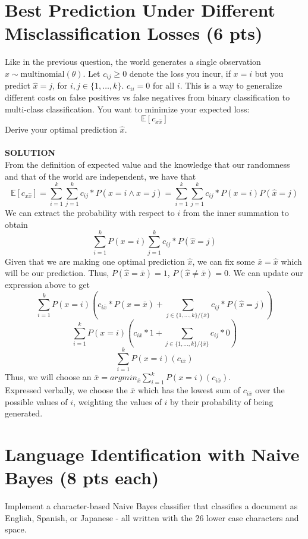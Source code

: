 \documentclass[a4paper]{article}
\theoremstyle{definition}
\def\E{\mathbb E}
\begin{document}
\section{Best Prediction Under Different Misclassification Losses (6 pts)}
Like in the previous question, 
the world generates a single observation $x \sim \mbox{multinomial}(\theta)$.
Let $c_{ij} \ge 0$ denote the loss you incur, if $x=i$ but you predict $\hat x=j$, for $i,j \in \{1, \ldots, k\}$.
$c_{ii}=0$ for all $i$.
This is a way to generalize different costs on false positives vs false negatives from binary classification to multi-class classification.
You want to minimize your expected loss:
$$\E[c_{x \hat x}]$$
Derive your optimal prediction $\hat x$.
\\\\
\textbf{SOLUTION}\\
From the definition of expected value and the knowledge that our randomness and that of the world are independent, we have that 
$$\E[c_{x \hat x}] = \sum_{i=1}^{k}{ \sum_{j=1}^{k}{c_{ij} * P(x=i \land \hat x=j)} } = \sum_{i=1}^{k}{ \sum_{j=1}^{k}{c_{ij} * P(x=i) P(\hat x=j)} } $$
We can extract the probability with respect to $i$ from the inner summation to obtain
$$ \sum_{i=1}^{k}{ P(x=i) \sum_{j=1}^{k}{c_{ij} * P(\hat x=j)} } $$
Given that we are making one optimal prediction $\hat x$, we can fix some $\bar x = \hat x$ which will be our prediction. Thus, $P(\hat x = \bar x) = 1$, $P(\hat x \neq \bar x) = 0$. We can update our expression above to get
$$ \sum_{i=1}^{k}{ P(x=i) \left( c_{i \bar x} * P(\hat x = \bar x) + \sum_{j \in \{ 1, \ldots, k \} / \{\bar x\}}{c_{ij} * P(\hat x=j)} \right) }$$
$$ \sum_{i=1}^{k}{ P(x=i) \left( c_{i \bar x} * 1 + \sum_{j \in \{ 1, \ldots, k \} / \{\bar x\}}{c_{ij} * 0} \right) }$$
$$ \sum_{i=1}^{k}{ P(x=i) \left( c_{i \bar x} \right) }$$
Thus, we will choose an $\bar x = argmin_{\bar x} \sum_{i=1}^{k}{ P(x=i) \left( c_{i \bar x} \right) }$. \\
Expressed verbally, we choose the $\bar x$ which has the lowest sum of $c_{i \bar x}$ over the possible values of $i$, weighting the values of $i$ by their probability of being generated.


\newpage

\section{Language Identification with Naive Bayes (8 pts each)}
Implement a character-based Naive Bayes classifier that classifies a document as English, Spanish, or Japanese - all written with the 26 lower case characters and space.
\end{document}

